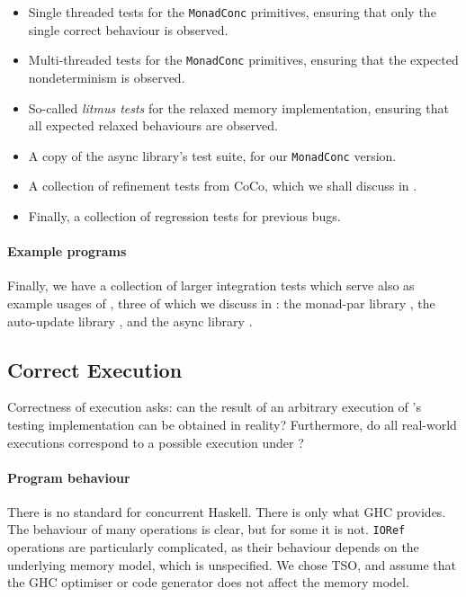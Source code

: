 \begin{itemize}
\item Single threaded tests for the \verb|MonadConc| primitives,
  ensuring that only the single correct behaviour is observed.
\item Multi-threaded tests for the \verb|MonadConc| primitives,
  ensuring that the expected nondeterminism is observed.
\item So-called \emph{litmus tests} for the relaxed memory
  implementation, ensuring that all expected relaxed behaviours are
  observed.
\item A copy of the async library's \parencite{async} test suite, for our
  \verb|MonadConc| version.
\item A collection of refinement tests from CoCo, which we shall
  discuss in .
\item Finally, a collection of regression tests for previous bugs.
\end{itemize}

\paragraph{Example programs}
Finally, we have a collection of larger integration tests which serve
also as example usages of \dejafu{}, three of which we discuss in
: the monad-par library
\parencite{monad_par,marlow2011}, the auto-update library
\parencite{auto_update}, and the async library \parencite{async}.

\subsection{Correct Execution}

Correctness of execution asks: can the result of an arbitrary
execution of \dejafu{}'s testing implementation can be obtained in
reality?  Furthermore, do all real-world executions correspond to a
possible execution under \dejafu{}?

\paragraph{Program behaviour}
There is no standard for concurrent Haskell.  There is only what GHC
provides.  The behaviour of many operations is clear, but for some it
is not.  \verb|IORef| operations are particularly complicated, as their
behaviour depends on the underlying memory model, which is
unspecified.  We chose TSO, and assume that the GHC optimiser or code
generator does not affect the memory model.

